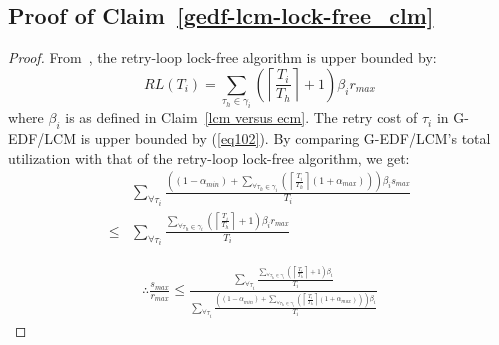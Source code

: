 \documentclass{sig-alternate}
\begin{document}
\subsection{\label{proof_gedf-lcm-lock-free_clm}Proof of Claim~\ref{gedf-lcm-lock-free_clm}}
\begin{proof}
From~\cite{key-5}, the retry-loop lock-free algorithm
is upper bounded by: 
\begin{equation}
RL(T_{i})=\sum_{\tau_{h}\in\gamma_{i}}\left(\left\lceil \frac{T_{i}}{T_{h}}\right\rceil +1\right)\beta_{i}r_{max}\label{eq32_1}
\end{equation}
 where $\beta_{i}$ is as defined in Claim~\ref{lcm versus ecm}.
The retry cost of $\tau_{i}$ in G-EDF/LCM is upper bounded by (\ref{eq102}).
By comparing G-EDF/LCM's total utilization with that of the retry-loop
lock-free algorithm, we get: 
\begin{eqnarray*}
 & \sum_{\forall\tau_{i}}\frac{\left((1-\alpha_{min})+\sum_{\forall\tau_{h}\in\gamma_{i}}\left(\left\lceil \frac{T_{i}}{T_{h}}\right\rceil (1+\alpha_{max})\right)\right)\beta_{i}s_{max}}{T_{i}}\\
\le & \sum_{\forall\tau_{i}}\frac{\sum_{\forall\tau_{h}\in\gamma_{i}}\left(\left\lceil \frac{T_{i}}{T_{h}}\right\rceil +1\right)\beta_{i}r_{max}}{T_{i}}
\end{eqnarray*}
 
\begin{eqnarray}
\therefore\frac{s_{max}}{r_{max}}\le\frac{\sum_{\forall\tau_{i}}\frac{\sum_{\forall\tau_{h}\in\gamma_{i}}\left(\left\lceil \frac{T_{i}}{T_{h}}\right\rceil +1\right)\beta_{i}}{T_{i}}}{\sum_{\forall\tau_{i}}\frac{\left((1-\alpha_{min})+\sum_{\forall\tau_{h}\in\gamma_{i}}\left(\left\lceil \frac{T_{i}}{T_{h}}\right\rceil (1+\alpha_{max})\right)\right)\beta_{i}}{T_{i}}}\label{u-gedf-lcm-ecm}
\end{eqnarray}



\end{proof}
\end{document}
